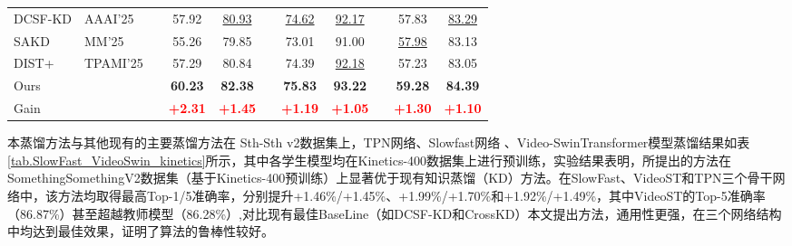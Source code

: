\documentclass[10.5pt,letterpaper]{article}
\begin{document}
\begin{table}[!htb]
{{\begin{tabular}{l l c c c c c c c c c}
				DCSF-KD\cite{tao-aaai2025-channelkd} & AAAI'25 && 57.92 & \underline{80.93} && \underline{74.62} & \underline{92.17} && 57.83 & \underline{83.29} \\
			    SAKD\cite{li-acmmm2025-slakd} & MM'25&& 55.26 & 79.85 && 73.01& 91.00   &&\underline{57.98}&83.13\\
			    DIST+\cite{huang-tpami2025-dist}&TPAMI'25&&57.29&80.84&&74.39&\underline{92.18}&&57.23&83.05\\
				Ours&  && \textbf{60.23} & \textbf{82.38} && \textbf{75.83} & \textbf{93.22} && \textbf{59.28} & \textbf{84.39} \\

				Gain& && \textcolor{red}{\textbf{+2.31}} & \textcolor{red}{\textbf{+1.45}} && \textcolor{red}{\textbf{+1.19}} & \textcolor{red}{\textbf{+1.05}} && \textcolor{red}{\textbf{+1.30}} & \textcolor{red}{\textbf{+1.10}} \\
				\toprule[0.75pt]
			\end{tabular}
		}
	}
\end{table}
本蒸馏方法与其他现有的主要蒸馏方法在 Sth-Sth v2\cite{goyal-iccv2017-sthsth}数据集上，TPN网络\cite{yang-cvpr2020-temporal}、Slowfast网络\cite{feichtenhofer-iccv2019-slowfast} 、Video-SwinTransformer\cite{liu-cvpr2022-video}模型蒸馏结果如表\ref{tab.SlowFast_VideoSwin_kinetics}所示，其中各学生模型均在Kinetics-400数据集上进行预训练，实验结果表明，所提出的方法在SomethingSomethingV2数据集（基于Kinetics-400预训练）上显著优于现有知识蒸馏（KD）方法。在SlowFast、VideoST和TPN三个骨干网络中，该方法均取得最高Top-1/5准确率，分别提升+1.46\%/+1.45\%、+1.99\%/+1.70\%和+1.92\%/+1.49\%，其中VideoST的Top-5准确率（86.87\%）甚至超越教师模型（86.28\%）,对比现有最佳BaseLine（如DCSF-KD和CrossKD）本文提出方法，通用性更强，在三个网络结构中均达到最佳效果，证明了算法的鲁棒性较好。
\end{document}
